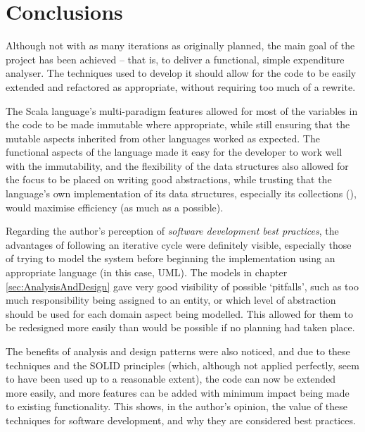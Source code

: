 \section{Conclusions} \label{sec:Conclusion}

Although not with as many iterations as originally planned, the main goal of
the project has been achieved -- that is, to deliver a functional, simple
expenditure analyser. The techniques used to develop it should allow for the
code to be easily extended and refactored as appropriate, without requiring too
much of a rewrite.

The Scala language's multi-paradigm features allowed for most of the variables
in the code to be made immutable where appropriate, while still ensuring that
the mutable aspects inherited from other languages worked as expected. The
functional aspects of the language made it easy for the developer to work well
with the immutability, and the flexibility of the data structures also allowed
for the focus to be placed on writing good abstractions, while trusting that
the language's own implementation of its data structures, especially its
collections (\cite[][Ch.~24]{odersky2016scala}), would maximise efficiency (as
much as a possible).

Regarding the author's perception of \emph{software development best
practices}, the advantages of following an iterative cycle were definitely
visible, especially those of trying to model the system before beginning the
implementation using an appropriate language (in this case, UML). The models in
chapter \ref{sec:AnalysisAndDesign} gave very good visibility of possible
`pitfalls', such as too much responsibility being assigned to an entity, or
which level of abstraction should be used for each domain aspect being
modelled. This allowed for them to be redesigned more easily than would be
possible if no planning had taken place.


The benefits of analysis and design patterns were also noticed, and due to
these techniques and the SOLID principles (which, although not applied
perfectly, seem to have been used up to a reasonable extent), the code can now
be extended more easily, and more features can be added with minimum impact
being made to existing functionality. This shows, in the author's opinion, the
value of these techniques for software development, and why they are considered
best practices.

